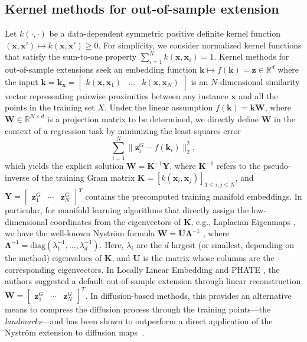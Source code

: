 \subsection{Kernel methods for out-of-sample extension}\label{subsec:kernel_methods}
Let $k(\cdot, \cdot)$ be a data-dependent symmetric positive definite kernel function $(\mathbf{x}, \mathbf{x}')\mapsto k(\mathbf{x}, \mathbf{x}')\geq 0$. For simplicity, we consider normalized kernel functions that satisfy the sum-to-one property $\sum_{i=1}^N k(\mathbf{x}, \mathbf{x}_i)=1$. Kernel methods for out-of-sample extensions seek an embedding function $\mathbf{k}\mapsto f(\mathbf{k})=\mathbf{z}\in \mathbb{R}^d$ where the input
$
    \mathbf{k} =  \mathbf{k}_{\mathbf{x}} = \begin{bmatrix}
     k(\mathbf{x}, \mathbf{x}_1)  & \hdots &     
     k(\mathbf{x}, \mathbf{x}_N)
\end{bmatrix}
$
is an $N$-dimensional similarity vector representing pairwise proximities between any instance $\mathbf{x}$ and all the points in the training set $X$. Under the linear assumption \(f(\mathbf{k}) = \mathbf{k}\mathbf{W}\), where \(\mathbf{W} \in \mathbb{R}^{N \times d}\) is a projection matrix to be determined, we directly define \(\mathbf{W}\) in the context of a regression task \cite{Gisbrecht2012oos, Gisbrecht2015kernel-tsne} by minimizing the least-squares error
\begin{equation}\label{eq:least-squares}
    \sum_{i=1}^N \|\mathbf{z}_i^G - f(\mathbf{k}_i)\|_2^2,
\end{equation}
which yields the explicit solution
$\mathbf{W} = \mathbf{K}^{-1}\mathbf{Y}$,
where \(\mathbf{K}^{-1}\) refers to the pseudo-inverse of the training Gram matrix $\mathbf{K}=[k(\mathbf{x}_i, \mathbf{x}_j)]_{1\leq i,j \leq N}$, and \(\mathbf{Y} = \begin{bmatrix}
    \mathbf{z}_1^G & \cdots & \mathbf{z}_N^G
\end{bmatrix}^T\) contains the precomputed training manifold embeddings. In particular, for manifold learning algorithms that directly assign the low-dimensional coordinates from the eigenvectors of $\mathbf{K}$, e.g., Laplacian Eigenmaps \cite{belkin2001laplacian}, we have the well-known Nyström formula \(\mathbf{W} = \mathbf{U}\mathbf{\Lambda}^{-1}\) \cite{bengio2003out, Arias2007connecting, Chen2013sparse}, where \(\mathbf{\Lambda}^{-1} = \text{diag}\left(  \lambda_1^{-1}, \hdots, \lambda_d^{-1} \right)\). Here, \(\lambda_i\) are the $d$ largest (or smallest, depending on the method) eigenvalues of $\mathbf{K}$, and \(\mathbf{U}\) is the matrix whose columns are the corresponding eigenvectors. In Locally Linear Embedding \cite{saul2003think} and PHATE \cite{Moon2019phate}, the authors suggested a default out-of-sample extension through linear reconstruction $\mathbf{W}=\begin{bmatrix}
    \mathbf{z}_1^G & \cdots & \mathbf{z}_N^G
\end{bmatrix}^T$. In diffusion-based methods, this provides an alternative means to compress the diffusion process through the training points---the \textit{landmarks}---and has been shown to outperform a direct application of the Nyström extension to diffusion maps~\cite{gigante2019compressed}.

